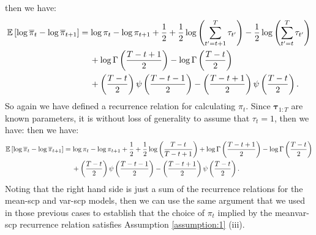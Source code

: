 then we have:
\small
\begin{align*}
    \mathbb{E}\left[\log\overline{\pi}_t - \log \overline{\pi}_{t+1} \right] &= \log \pi_t- \log \pi_{t+1} + \frac{1}{2} + \frac{1}{2}\log\left(\sum_{t'=t+1}^T \tau_{t'}\right) - \frac{1}{2}\log\left(\sum_{t'=t}^T \tau_{t'}\right) \\
    &\quad \:+ \log \Gamma\left(\frac{ T-t+1}{2}\right) - \log \Gamma\left(\frac{T-t}{2}\right)  \\
    &\quad \: + \left(\frac{T - t}{2}\right)\psi\left(\frac{T-t-1}{2}\right) - \left(\frac{T - t +1}{2}\right)\psi\left(\frac{T-t}{2}\right).
\end{align*}
\normalsize
So again we have defined a recurrence relation for calculating $\pi_t$. Since $\boldsymbol{\tau}_{1:T}$ are known parameters, it is without loss of generality to assume that $\tau_t = 1$, then we have:   
then we have:
\small
\begin{align*}
    \mathbb{E}\left[\log\overline{\pi}_t - \log \overline{\pi}_{t+1} \right] &= \log \pi_t- \log \pi_{t+1} + \frac{1}{2} + \frac{1}{2}\log\left(\frac{T-t}{T-t+1}\right) + \log \Gamma\left(\frac{ T-t+1}{2}\right) - \log \Gamma\left(\frac{T-t}{2}\right)  \\
    &\quad \: + \left(\frac{T - t}{2}\right)\psi\left(\frac{T-t-1}{2}\right) - \left(\frac{T - t +1}{2}\right)\psi\left(\frac{T-t}{2}\right).
\end{align*}
\normalsize
Noting that the right hand side is just a sum of the recurrence relations for the mean-scp and var-scp models, then we can use the same argument that we used in those previous cases to establish that the choice of $\pi_t$ implied by the meanvar-scp recurrence relation satisfies Assumption \ref{assumption:1} (iii).

\normalsize